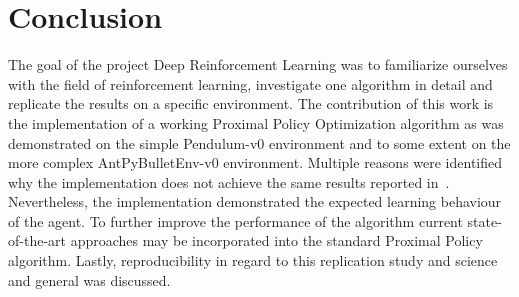 \chapter{Conclusion}\label{ch:conclusion}
The goal of the project Deep Reinforcement Learning was to familiarize ourselves with the field of reinforcement learning,
investigate one algorithm in detail and replicate the results on a specific environment.
The contribution of this work is the implementation of a working Proximal Policy Optimization algorithm as was
demonstrated on the simple Pendulum-v0 environment and to some extent on the more complex AntPyBulletEnv-v0 environment.
Multiple reasons were identified why the implementation does not achieve the same results reported in~\cite{Raffin2020}.
Nevertheless, the implementation demonstrated the expected learning behaviour of the agent.
To further improve the performance of the algorithm current state-of-the-art approaches may be incorporated into the
standard Proximal Policy algorithm.
Lastly, reproducibility in regard to this replication study and science and general was discussed.